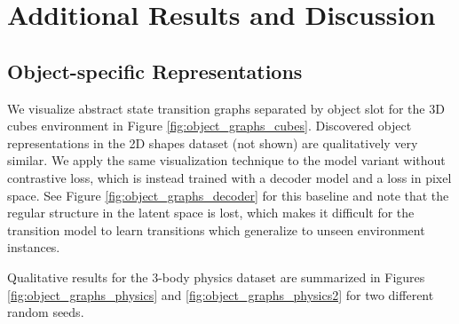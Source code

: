 \documentclass{article} %
\begin{document}



\newpage
\appendix

\section{Additional Results and Discussion}
\label{sec:additional_results}
\subsection{Object-specific Representations}
\label{sec:object-representations}
We visualize abstract state transition graphs separated by object slot for the 3D cubes environment in Figure \ref{fig:object_graphs_cubes}. Discovered object representations in the 2D shapes dataset (not shown) are qualitatively very similar. We apply the same visualization technique to the model variant without contrastive loss, which is instead trained with a decoder model and a loss in pixel space. See Figure \ref{fig:object_graphs_decoder} for this baseline and note that the regular structure in the latent space is lost, which makes it difficult for the transition model to learn transitions which generalize to unseen environment instances.


Qualitative results for the 3-body physics dataset are summarized in Figures \ref{fig:object_graphs_physics} and \ref{fig:object_graphs_physics2} for two different random seeds.
\end{document}
